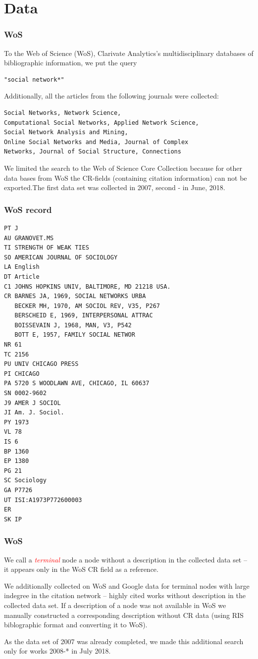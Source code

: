 \documentclass[hyperref={pdfstartview={FitBH -32768},
                         pdfpagemode=FullScreen,
                         plainpages=false,
                         colorlinks=true}
              ]{beamer}
\newcommand{\keyw}[1]{\textcolor{red}{\emph{#1}}}
\begin{document}
\section{Data}

\begin{frame}[fragile]
\frametitle{WoS}
\small

To the Web of Science (WoS), Clarivate Analytics’s multidisciplinary databases of bibliographic
information, we put the query
\begin{verbatim} 
"social network*"
\end{verbatim}
Additionally, all the articles from the following journals were collected:
\begin{verbatim}
Social Networks, Network Science, 
Computational Social Networks, Applied Network Science, 
Social Network Analysis and Mining,
Online Social Networks and Media, Journal of Complex 
Networks, Journal of Social Structure, Connections 
\end{verbatim}
We limited the search to the Web of Science Core Collection because for other data bases from WoS the CR-fields (containing citation information) can not
be exported.The first data set was collected in 2007, second - in June, 2018. 
\end{frame}

\begin{frame}[fragile]
\frametitle{WoS record}
\renewcommand{\baselinestretch}{0.8}
\tiny
\begin{verbatim}
PT J
AU GRANOVET.MS
TI STRENGTH OF WEAK TIES
SO AMERICAN JOURNAL OF SOCIOLOGY
LA English
DT Article
C1 JOHNS HOPKINS UNIV, BALTIMORE, MD 21218 USA.
CR BARNES JA, 1969, SOCIAL NETWORKS URBA
   BECKER MH, 1970, AM SOCIOL REV, V35, P267
   BERSCHEID E, 1969, INTERPERSONAL ATTRAC
   BOISSEVAIN J, 1968, MAN, V3, P542
   BOTT E, 1957, FAMILY SOCIAL NETWOR
NR 61
TC 2156
PU UNIV CHICAGO PRESS
PI CHICAGO
PA 5720 S WOODLAWN AVE, CHICAGO, IL 60637
SN 0002-9602
J9 AMER J SOCIOL
JI Am. J. Sociol.
PY 1973
VL 78
IS 6
BP 1360
EP 1380
PG 21
SC Sociology
GA P7726
UT ISI:A1973P772600003
ER
SK IP
\end{verbatim}
\end{frame}

\begin{frame}[fragile]
\frametitle{WoS}
\small
We call a \keyw{terminal} node  a node without a description in the collected data set -- it appears only in the WoS CR field as a reference. \medskip

We additionally collected on WoS and Google data for terminal nodes with large indegree in the citation network -- highly cited works without description in the collected data set. If a description of a node was not available in WoS we manually constructed a corresponding description without CR data (using RIS biblographic format and converting it to WoS).\medskip

As the data set of 2007 was already completed, we made this additional search only for works 2008-* in July 2018. 
\end{frame}
\end{document}
